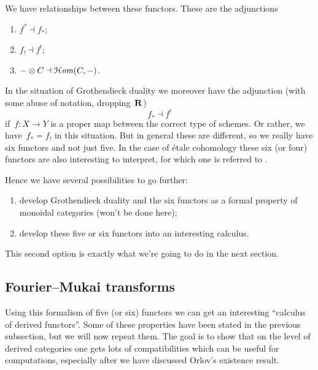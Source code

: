 \documentclass[10pt,a4paper]{article}
\begin{document}
We have relationships between these functors. These are the adjunctions
\begin{enumerate}
  \item $f^*\dashv f_*$;
  \item $f_!\dashv f^!$;
  \item $-\otimes C\dashv \operatorname{\mathcal{H}\mathit{om}}(C,-)$.
\end{enumerate}
In the situation of Grothendieck duality we moreover have the adjunction (with some abuse of notation, dropping~$\mathbf{R}$)
\begin{equation}
  f_*\dashv f^!
\end{equation}
if~$f\colon X\to Y$ is a proper map between the correct type of schemes. Or rather, we have~$f_*=f_!$ in this situation. But in general these are different, so we really have six functors and not just five. In the case of \'etale cohomology these six (or four) functors are also interesting to interpret, for which one is referred to \cite{milne-etale-cohomology}.

Hence we have several possibilities to go further:
\begin{enumerate}
  \item develop Grothendieck duality and the six functors as a formal property of monoidal categories (won't be done here);
  \item develop these five or six functors into an interesting calculus.
\end{enumerate}
This second option is exactly what we're going to do in the next section.

\subsection{Fourier--Mukai transforms}
Using this formalism of five (or six) functors we can get an interesting ``calculus of derived functors''. Some of these properties have been stated in the previous subsection, but we will now repeat them. The goal is to show that on the level of derived categories one gets lots of compatibilities which can be useful for computations, especially after we have discussed Orlov's existence result.
\end{document}
